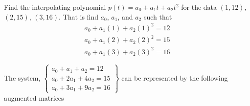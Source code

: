 \documentclass{mathhomework}
\begin{document}
\begin{problem}[1.2\#33]
    Find the interpolating polynomial $p(t) = a_0 + a_1t + a_2t^2$ for the data $(1,12)$, $(2,15)$, $(3,16)$. That is find $a_0$, $a_1$, and $a_2$ such that
    \begin{align*}
        a_0 + a_1(1) + a_2(1)^2 = 12 \\
        a_0 + a_1(2) + a_2(2)^2 = 15 \\
        a_0 + a_1(3) + a_2(3)^2 = 16
    \end{align*}

    \begin{solution}
        The system, $\begin{Bmatrix}
            a_0 + a_1 + a_2 = 12 \\
            a_0 + 2a_1 + 4a_2 = 15 \\
            a_0 + 3a_1 + 9a_2 = 16
        \end{Bmatrix}$ can be represented by the following augmented matrices
    

\end{solution}
\end{problem}
\end{document}
